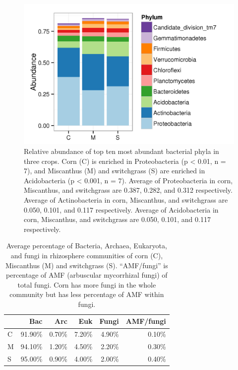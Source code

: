 \documentclass[]{msu-thesis}
\begin{document}
\begin{figure}[tbph!]
  \centering
  \includegraphics[scale=1]{figs/chap4-otu-bac-phylum}
  \caption[Relative abundance of top ten most abundant bacterial phyla in three crops]{Relative abundance of top ten most abundant bacterial phyla in three crops. Corn (C) is enriched in Proteobacteria (p < 0.01, n = 7), and Miscanthus (M) and switchgrass (S) are enriched in Acidobacteria (p < 0.001, n = 7). Average of Proteobacteria in corn, Miscanthus, and switchgrass are 0.387, 0.282, and 0.312 respectively. Average of Actinobacteria in corn, Miscanthus, and switchgrass are 0.050, 0.101, and 0.117 respectively. Average of Acidobacteria in corn, Miscanthus, and switchgrass are 0.050, 0.101, and 0.117 respectively.}
  \label{fig:chap4Fig2}
\end{figure}


\begin{table}[htbp]
  \centering
  \caption[Domain level distribution in rhizosphere communities]{Average percentage of Bacteria, Archaea, Eukaryota, and fungi in rhizosphere communities of corn (C), Miscanthus (M) and switchgrass (S).  “AMF/fungi” is percentage of AMF (arbuscular mycorrhizal  fungi) of total fungi.  Corn has more fungi in the whole community but has less percentage of AMF within fungi.}
    \begin{tabular}{|lrrrrr|}
    \toprule
          & Bac   & Arc   & Euk   & Fungi & AMF/fungi \\
    \midrule
    C     & 91.90\% & 0.70\% & 7.20\% & 4.90\% & 0.10\% \\
    M     & 94.10\% & 1.20\% & 4.50\% & 2.20\% & 0.30\% \\
    S     & 95.00\% & 0.90\% & 4.00\% & 2.00\% & 0.40\% \\
    \bottomrule
    \end{tabular}%
  \label{tab:chap4TabS5}%
\end{table}%
\end{document}
